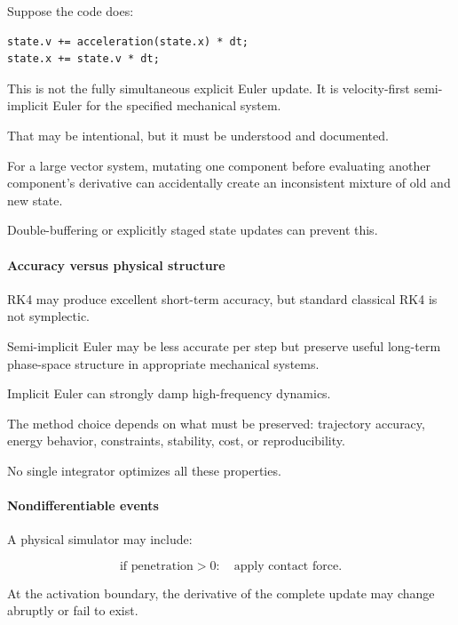 Suppose the code does:

\begin{verbatim}
state.v += acceleration(state.x) * dt;
state.x += state.v * dt;
\end{verbatim}

This is not the fully simultaneous explicit Euler update. It is velocity-first semi-implicit Euler for the specified mechanical system.

That may be intentional, but it must be understood and documented.

For a large vector system, mutating one component before evaluating another component's derivative can accidentally create an inconsistent mixture of old and new state.

Double-buffering or explicitly staged state updates can prevent this.

\paragraph{Accuracy versus physical structure}\label{02-foundations-ii-ch022-accuracy-versus-physical-structure}

\hypertarget{02-foundations-ii-ch022-accuracy-versus-physical-structure}{}

RK4 may produce excellent short-term accuracy, but standard classical RK4 is not symplectic.

Semi-implicit Euler may be less accurate per step but preserve useful long-term phase-space structure in appropriate mechanical systems.

Implicit Euler can strongly damp high-frequency dynamics.

The method choice depends on what must be preserved: trajectory accuracy, energy behavior, constraints, stability, cost, or reproducibility.

No single integrator optimizes all these properties.

\paragraph{Nondifferentiable events}\label{02-foundations-ii-ch022-nondifferentiable-events}

\hypertarget{02-foundations-ii-ch022-nondifferentiable-events}{}

A physical simulator may include:

\[
\text{if penetration}>0: \quad\text{apply contact force}.
\]

At the activation boundary, the derivative of the complete update may change abruptly or fail to exist.

